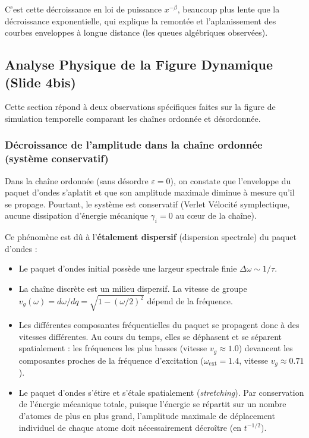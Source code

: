 \documentclass[11pt,a4paper]{article}
\begin{document}
\begin{enumerate}
    C'est cette décroissance en loi de puissance $x^{-\beta}$, beaucoup plus lente que la décroissance exponentielle, qui explique la remontée et l'aplanissement des courbes enveloppes à longue distance (les queues algébriques observées).
\end{enumerate}

\subsection{Analyse Physique de la Figure Dynamique (Slide 4bis)}
Cette section répond à deux observations spécifiques faites sur la figure de simulation temporelle comparant les chaînes ordonnée et désordonnée.

\subsubsection{Décroissance de l'amplitude dans la chaîne ordonnée (système conservatif)}
Dans la chaîne ordonnée (sans désordre $\varepsilon = 0$), on constate que l'enveloppe du paquet d'ondes s'aplatit et que son amplitude maximale diminue à mesure qu'il se propage. Pourtant, le système est conservatif (Verlet Vélocité symplectique, aucune dissipation d'énergie mécanique $\gamma_i = 0$ au cœur de la chaîne).

Ce phénomène est dû à l'\textbf{étalement dispersif} (dispersion spectrale) du paquet d'ondes :
\begin{itemize}
    \item Le paquet d'ondes initial possède une largeur spectrale finie $\Delta\omega \sim 1/\tau$.
    \item La chaîne discrète est un milieu dispersif. La vitesse de groupe $v_g(\omega) = d\omega/dq = \sqrt{1 - (\omega/2)^2}$ dépend de la fréquence.
    \item Les différentes composantes fréquentielles du paquet se propagent donc à des vitesses différentes. Au cours du temps, elles se déphasent et se séparent spatialement : les fréquences les plus basses (vitesse $v_g \approx 1.0$) devancent les composantes proches de la fréquence d'excitation ($\omega_{\text{ext}} = 1.4$, vitesse $v_g \approx 0.71$).
    \item Le paquet d'ondes s'étire et s'étale spatialement (\textit{stretching}). Par conservation de l'énergie mécanique totale, puisque l'énergie se répartit sur un nombre d'atomes de plus en plus grand, l'amplitude maximale de déplacement individuel de chaque atome doit nécessairement décroître (en $t^{-1/2}$).
\end{itemize}
\end{document}
